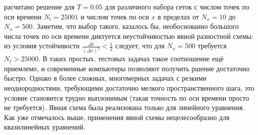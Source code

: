 расчитано решение для $T = 0.05$ для различного набора сеток с числом точек по оси времени $N_t = 25001$ и числом точек по оси $x$ в пределах от $N_x = 10$ до $N_x = 500$.
Заметим, что выбор такого, казалось бы, необоснованно большого числа точек по оси времени диктуется неустойчивостью явной разностной схемы: из условия устойчивости $\frac{\Delta t}{(\Delta x)^2} < \frac{1}{2}$ следует, что для $N_x = 500$ требуется $N_t > 25000$.
В таких простых, тестовых задачах такое соотношение ещё приемлемо, и современные компьютеры позволяют получить ршение достаточно быстро.
Однако в более сложных, многомерных задачах с резкими неоднородностями, требующими достаточно мелкого пространственного шага, это условие становится трудно выплонимым (такая точность по оси времени просто не требуется).
Явная схема была реализована только для линейного уравнения.
Как уже отмечалось выше, применения явной схемы нецелесообразно для квазилинейных уравнений.



